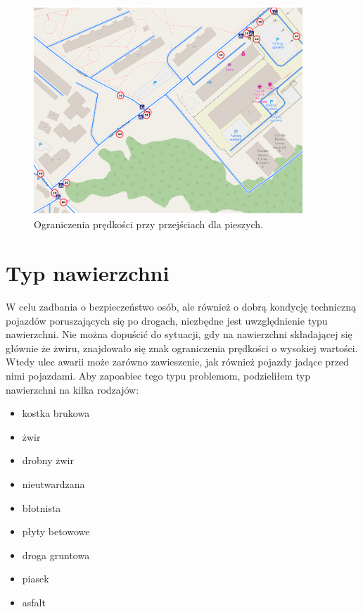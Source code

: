 \begin{figure}[h]
\caption{Ograniczenia prędkości przy przejściach dla pieszych.}
\label{sec:przejsciePredkosci}
\centering
\includegraphics[width=0.9\textwidth]{pedestrian_speed}
\end{figure}

\newpage
\section{Typ nawierzchni}
\label{sec:surfaceType}

W celu zadbania o bezpieczeństwo osób, ale również o dobrą kondycję techniczną pojazdów poruszających się po drogach, niezbędne jest uwzględnienie typu nawierzchni. Nie można dopuścić do sytuacji, gdy na nawierzchni składającej się głównie że żwiru, znajdowało się znak ograniczenia prędkości o wysokiej wartości. Wtedy ulec awarii może zarówno zawieszenie, jak również pojazdy jadące przed nimi pojazdami. Aby zapoabiec tego typu problemom, podzieliłem typ nawierzchni na kilka rodzajów:

\begin{itemize}
\item kostka brukowa
\item żwir
\item drobny żwir
\item nieutwardzana
\item błotnista
\item płyty  betowowe
\item droga gruntowa
\item piasek
\item asfalt
\end{itemize}

